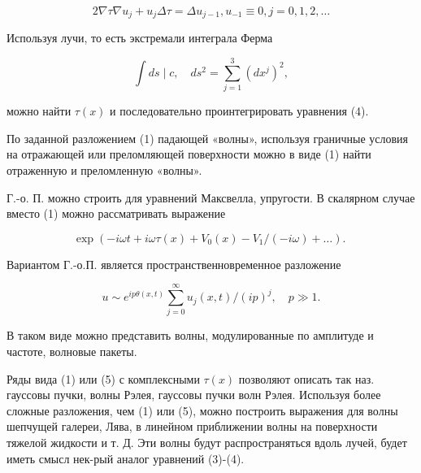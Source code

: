 \documentclass[10pt]{article}
\begin{document}
\[

2 \nabla \tau \nabla u_{j}+u_{j} \Delta \tau=\Delta u_{j-1}, u_{-1} \equiv 0, j=0,1,2, \ldots

\]



Используя лучи, то есть экстремали интеграла Ферма



\[

\int d s \mid c, \quad d s^{2}=\sum_{j=1}^{3}\left(d x^{j}\right)^{2},

\]



можно найти $\tau(x)$ и последовательно проинтегрировать уравнения (4).



По заданной разложением (1) падающей «волны», используя граничные условия на отражающей или преломляющей поверхности можно в виде (1) найти отраженную и преломленную «волны».



Г.-о. П. можно строить для уравнений Максвелла, упругости. В скалярном случае вместо (1) можно рассматривать выражение



\[

\exp \left(-i \omega t+i \omega \tau(x)+V_{0}(x)-V_{1} /(-i \omega)+\ldots\right) \text {. }

\]



Вариантом Г.-о.П. является пространственновременное разложение



\[

u \sim e^{i p \theta(x, t)} \sum_{j=0}^{\infty} u_{j}(x, t) /(i p)^{j}, \quad p \gg 1 .

\]



В таком виде можно представить волны, модулированные по амплитуде и частоте, волновые пакеты.



Ряды вида (1) или (5) с комплексными $\tau(x)$ позволяют описать так наз. гауссовы пучки, волны Рэлея, гауссовы пучки волн Рэлея. Используя более сложные разложения, чем (1) или (5), можно построить выражения для волны шепчущей галереи, Лява, в линейном приближении волны на поверхности тяжелой жидкости и т. Д. Эти волны будут распространяться вдоль лучей, будет иметь смысл нек-рый аналог уравнений (3)-(4).
\end{document}
